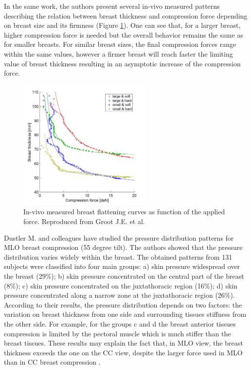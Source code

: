 In the same work, the authors present several in-vivo measured patterns describing the relation between breast thickness and compression force depending on breast size and its firmness (Figure \ref{fig:thickness_force_patterns_groot}). One can see that, for a larger breast, higher compression force is needed but the overall behavior remains the same as for smaller breasts. For similar breast sizes, the final compression forces range within the same values, however a firmer breast will reach faster the limiting value of breast thickness resulting in an asymptotic increase of the compression force.
\begin{figure}[!h]
\centering
\includegraphics[width=0.6\textwidth,keepaspectratio]{figures/thickness_force_patterns_groot.jpg} 
\caption{In-vivo measured breast flattening curves as function of the applied force. Reproduced from Groot J.E. et al. \citep{groot_towards_2015}}\label{fig:thickness_force_patterns_groot}
\end{figure}

Dustler M. and colleagues \citep{dustler_breast_2012} have studied the pressure distribution patterns for MLO breast compression (55 degree tilt). The authors showed that the pressure distribution varies widely within the breast. The obtained patterns from 131 subjects were classified into four main groups: a) skin pressure widespread over the breast (29\%); b) skin pressure concentrated on the central part of the breast (8\%); c) skin pressure concentrated on the juxtathoracic region (16\%); d) skin pressure concentrated along a narrow zone at the juxtathoracic region (26\%). According to their results, the pressure distribution depends on two factors: the variation on breast thickness from one side and surrounding tissues stiffness from the other side. For example, for the groups c and d the breast anterior tissues compression is limited by the pectoral muscle which is much stiffer than the breast tissues.  These results may explain the fact that, in MLO view, the breast thickness exceeds the one on the CC view, despite the larger force used in MLO than in CC breast compression \citep{mercer_practitioner_2013, helvie_breast_1994}. 

